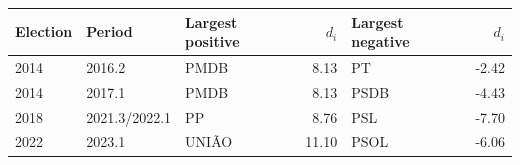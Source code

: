 \begin{tabular}{lllrlr}
\toprule
Election & Period & Largest positive & \(d_i\) & Largest negative & \(d_i\) \\
\midrule
2014 & 2016.2 & PMDB & 8.13 & PT & -2.42 \\
2014 & 2017.1 & PMDB & 8.13 & PSDB & -4.43 \\
2018 & 2021.3/2022.1 & PP & 8.76 & PSL & -7.70 \\
2022 & 2023.1 & UNIÃO & 11.10 & PSOL & -6.06 \\
\bottomrule
\end{tabular}
